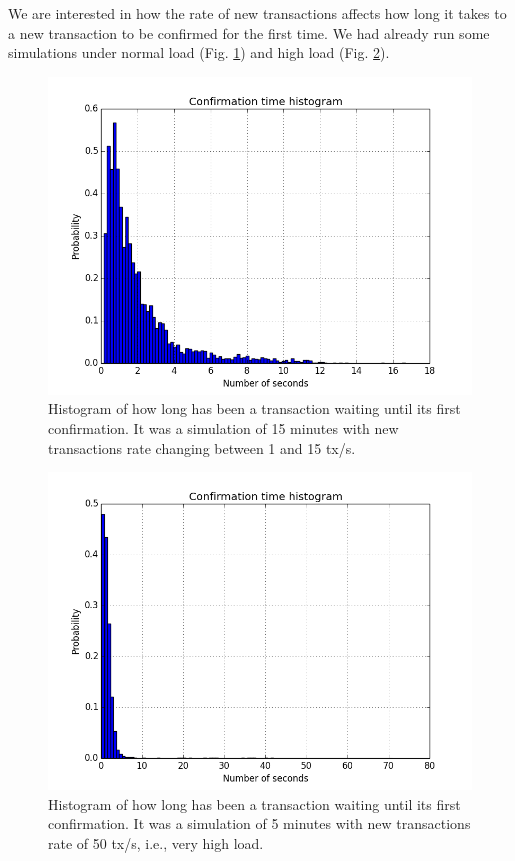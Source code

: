 We are interested in how the rate of new transactions affects how long it takes to a new transaction to be confirmed for the first time. We had already run some simulations under normal load (Fig. \ref{fig-tangle-hist}) and high load (Fig. \ref{fig-tangle-hist-2}).

\begin{figure}[ht]
\centering\includegraphics[width=\textwidth]{./images01/fig-tangle-hist.png}
\caption{Histogram of how long has been a transaction waiting until its first confirmation. It was a simulation of 15 minutes with new transactions rate changing between 1 and 15 tx/s.\label{fig-tangle-hist}}
\end{figure}

\begin{figure}[ht]
\centering\includegraphics[width=\textwidth]{./images01/fig-tangle-hist-2.png}
\caption{Histogram of how long has been a transaction waiting until its first confirmation. It was a simulation of 5 minutes with new transactions rate of 50 tx/s, i.e., very high load.\label{fig-tangle-hist-2}}
\end{figure}


